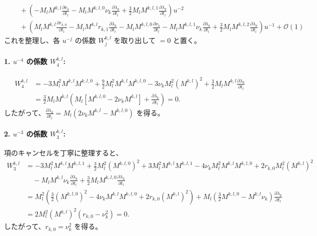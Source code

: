 \begin{align*}
    &\quad + \left( - M_l M^{k,l} \frac{\partial \nu_k}{\partial t_l} - M_l M^{k,l,0} \nu_k \frac{\partial \lambda_k}{\partial t_l} + \frac{3}{2} M_l M^{k,l,1} \frac{\partial \lambda_k}{\partial t_l} \right) u^{-2} \\
    &\quad + \left( M_l M^{k,l} \frac{\partial r_{k,0}}{\partial t_l} - M_l M^{k,l} r_{k,1}\frac{\partial \lambda_{k}}{\partial t_l} - M_l M^{k,l,0} \frac{\partial \nu_k}{\partial t_l} - M_l M^{k,l,1} \nu_k \frac{\partial \lambda_k}{\partial t_l} + \frac{3}{2} M_l M^{k,l,2} \frac{\partial \lambda_k}{\partial t_l} \right) u^{-1} + \mathcal{O}(1)
\end{align*}
これを整理し、各 $u^{-j}$ の係数 $W_j^{k,l}$ を取り出して $=0$ と置く。

\paragraph{1. $u^{-4}$ の係数 $W_4^{k,l}$:}
\begin{align*}
    W_4^{k,l} &= -3 M_l^2 M^{k,l} M^{k,l,0} + \frac{9}{2} M_l^2 M^{k,l} M^{k,l,0} - 3 \nu_k M_l^2 (M^{k,l})^2 + \frac{3}{2} M_l M^{k,l} \frac{\partial \lambda_k}{\partial t_l} \\
    &= \frac{3}{2} M_l M^{k,l} \left( M_l \left[ M^{k,l,0} - 2\nu_k M^{k,l} \right] + \frac{\partial \lambda_k}{\partial t_l} \right) = 0.
\end{align*}
したがって、$\frac{\partial \lambda_k}{\partial t_l} = M_l (2 \nu_k M^{k,l} - M^{k,l,0})$ を得る。

\paragraph{2. $u^{-3}$ の係数 $W_3^{k,l}$:}
項のキャンセルを丁寧に整理すると、
\begin{align*}
    W_3^{k,l} &= -3 M_l^2 M^{k,l} M^{k,l,1} + \frac{3}{2} M_l^2 (M^{k,l,0})^2 + 3 M_l^2 M^{k,l} M^{k,l,1} - 4 \nu_k M_l^2 M^{k,l} M^{k,l,0} + 2r_{k,0} M_l^2 (M^{k,l})^2 \\
    &\quad - M_l M^{k,l} \nu_k \frac{\partial \lambda_k}{\partial t_l} + \frac{3}{2} M_l M^{k,l,0} \frac{\partial \lambda_k}{\partial t_l} \\
    &= M_l^2 \left( \frac{3}{2} (M^{k,l,0})^2 - 4\nu_k M^{k,l} M^{k,l,0} + 2r_{k,0}(M^{k,l})^2 \right) + M_l \left( \frac{3}{2} M^{k,l,0} - M^{k,l}\nu_k \right) \frac{\partial \lambda_k}{\partial t_l} \\
    &= 2 M_l^2 (M^{k,l})^2 \left( r_{k,0} - \nu_k^2 \right) = 0.
\end{align*}
したがって、$r_{k,0} = \nu_k^2$ を得る。

